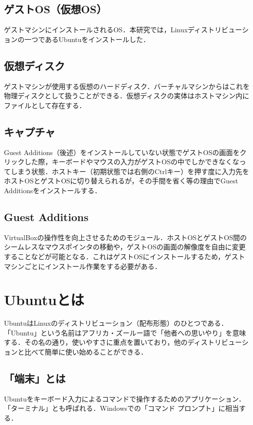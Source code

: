 \subsection{ゲストOS（仮想OS）}
ゲストマシンにインストールされるOS．本研究では，Linuxディストリビューションの一つであるUbuntuをインストールした．

\subsection{仮想ディスク}
ゲストマシンが使用する仮想のハードディスク．バーチャルマシンからはこれを物理ディスクとして扱うことができる．仮想ディスクの実体はホストマシン内にファイルとして存在する．

\subsection{キャプチャ}
Guest Additions（後述）をインストールしていない状態でゲストOSの画面をクリックした際，キーボードやマウスの入力がゲストOSの中でしかできなくなってしまう状態．ホストキー（初期状態では右側のCtrlキー）を押す度に入力先をホストOSとゲストOSに切り替えられるが，その手間を省く等の理由でGuest Additionsをインストールする．

\subsection{Guest Additions}
VirtualBoxの操作性を向上させるためのモジュール．ホストOSとゲストOS間のシームレスなマウスポインタの移動や，ゲストOSの画面の解像度を自由に変更することなどが可能となる\cite{LinuxMania}．これはゲストOSにインストールするため，ゲストマシンごとにインストール作業をする必要がある．

\section{Ubuntuとは}
UbuntuはLinuxのディストリビューション（配布形態）のひとつである．「Ubuntu」という名前はアフリカ・ズールー語で「他者への思いやり」を意味する．その名の通り，使いやすさに重点を置いており，他のディストリビューションと比べて簡単に使い始めることができる\cite{whatsubuntu}．

\subsection{「端末」とは}
Ubuntuをキーボード入力によるコマンドで操作するためのアプリケーション．「ターミナル」とも呼ばれる．Windowsでの「コマンド プロンプト」に相当する．

